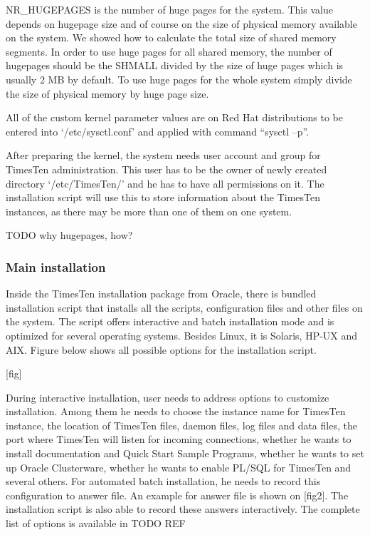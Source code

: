 \documentclass[11pt, letterpaper]{article}            %
\begin{document}
NR_HUGEPAGES is the number of huge pages for the system. This value depends on hugepage size and of course on the size of physical memory available on the system. We showed how to calculate the total size of shared memory segments. In order to use huge pages for all shared memory, the number of hugepages should be the SHMALL divided by the size of huge pages which is usually 2 MB by default. To use huge pages for the whole system simply divide the size of physical memory by huge page size.

All of the custom kernel parameter values are on Red Hat distributions to be entered into ‘/etc/sysctl.conf’ and applied with command “sysctl –p”.

After preparing the kernel, the system needs user account and group for TimesTen administration. This user has to be the owner of newly created directory ‘/etc/TimesTen/’ and he has to have all permissions on it. The installation script will use this to store information about the TimesTen instances, as there may be more than one of them on one system.

TODO why hugepages, how?

\subsubsection{Main installation}

Inside the TimesTen installation package from Oracle, there is bundled installation script that installs all the scripts, configuration files and other files on the system. The script offers interactive and batch installation mode and is optimized for several operating systems. Besides Linux, it is Solaris, HP-UX and AIX. Figure below shows all possible options for the installation script.

[fig]

During interactive installation, user needs to address options to customize installation. Among them he needs to choose the instance name for TimesTen instance, the location of TimesTen files, daemon files, log files and data files, the port where TimesTen will listen for incoming connections, whether he wants to install documentation and Quick Start Sample Programs, whether he wants to set up Oracle Clusterware, whether he wants to enable PL/SQL for TimesTen and several others. For automated batch installation, he needs to record this configuration to answer file. An example for answer file is shown on [fig2]. The installation script is also able to record these answers interactively. The complete list of options is available in TODO REF
\end{document}

